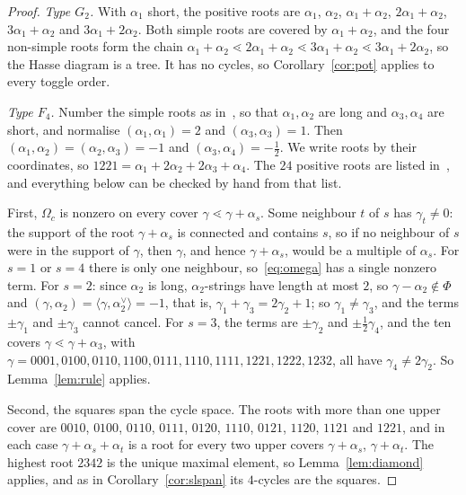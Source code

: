 \documentclass[11pt]{amsart}
\theoremstyle{definition}
\begin{document}
\begin{proof}
\emph{Type $G_2$.} With $\alpha_1$ short, the positive roots are $\alpha_1$, $\alpha_2$, $\alpha_1+\alpha_2$, $2\alpha_1+\alpha_2$, $3\alpha_1+\alpha_2$ and $3\alpha_1+2\alpha_2$. Both simple roots are covered by $\alpha_1+\alpha_2$, and the four non-simple roots form the chain $\alpha_1+\alpha_2\lessdot2\alpha_1+\alpha_2\lessdot3\alpha_1+\alpha_2\lessdot3\alpha_1+2\alpha_2$, so the Hasse diagram is a tree. It has no cycles, so Corollary~\ref{cor:pot} applies to every toggle order.

\emph{Type $F_4$.} Number the simple roots as in~\cite[Plate~VIII]{Bou}, so that $\alpha_1,\alpha_2$ are long and $\alpha_3,\alpha_4$ are short, and normalise $(\alpha_1,\alpha_1)=2$ and $(\alpha_3,\alpha_3)=1$. Then $(\alpha_1,\alpha_2)=(\alpha_2,\alpha_3)=-1$ and $(\alpha_3,\alpha_4)=-\tfrac12$. We write roots by their coordinates, so $1221=\alpha_1+2\alpha_2+2\alpha_3+\alpha_4$. The $24$ positive roots are listed in~\cite[Plate~VIII]{Bou}, and everything below can be checked by hand from that list.

First, $\Omega_c$ is nonzero on every cover $\gamma\lessdot\gamma+\alpha_s$. Some neighbour $t$ of $s$ has $\gamma_t\neq0$: the support of the root $\gamma+\alpha_s$ is connected and contains $s$, so if no neighbour of $s$ were in the support of $\gamma$, then $\gamma$, and hence $\gamma+\alpha_s$, would be a multiple of $\alpha_s$. For $s=1$ or $s=4$ there is only one neighbour, so~\eqref{eq:omega} has a single nonzero term. For $s=2$: since $\alpha_2$ is long, $\alpha_2$-strings have length at most $2$, so $\gamma-\alpha_2\notin\Phi$ and $(\gamma,\alpha_2)=\langle\gamma,\alpha_2^\vee\rangle=-1$, that is, $\gamma_1+\gamma_3=2\gamma_2+1$; so $\gamma_1\neq\gamma_3$, and the terms $\pm\gamma_1$ and $\pm\gamma_3$ cannot cancel. For $s=3$, the terms are $\pm\gamma_2$ and $\pm\tfrac12\gamma_4$, and the ten covers $\gamma\lessdot\gamma+\alpha_3$, with $\gamma=0001,0100,0110,1100,0111,1110,1111,1221,1222,1232$, all have $\gamma_4\neq2\gamma_2$. So Lemma~\ref{lem:rule} applies.

Second, the squares span the cycle space. The roots with more than one upper cover are $0010$, $0100$, $0110$, $0111$, $0120$, $1110$, $0121$, $1120$, $1121$ and $1221$, and in each case $\gamma+\alpha_s+\alpha_t$ is a root for every two upper covers $\gamma+\alpha_s$, $\gamma+\alpha_t$. The highest root $2342$ is the unique maximal element, so Lemma~\ref{lem:diamond} applies, and as in Corollary~\ref{cor:slspan} its $4$-cycles are the squares.


\end{proof}
\end{document}
